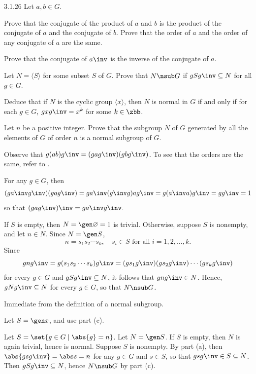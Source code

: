 \begin{exercise}{3.1.26} 
    Let $a,b \in G$.
    \begin{subexercises}
        \item Prove that the conjugate of the product of $a$ and $b$ is the product of the conjugate of $a$ and the conjugate of $b$.
	    Prove that the order of $a$ and the order of any conjugate of $a$ are the same.
        \item Prove that the conjugate of $a\inv $ is the inverse of the conjugate of $a$.
        \item Let $N = \langle S \rangle$ for some subset $S$ of $G$.
	    Prove that $N \nsub G$ if $gSg\inv  \subseteq N$ for all $g \in G$.
        \item Deduce that if $N$ is the cyclic group $\langle x \rangle$, then $N$ is normal in $G$ if and only if for each $g \in G$, $gxg\inv  = x^k$ for some $k \in \zbb$.
        \item Let $n$ be a positive integer.
	    Prove that the subgroup $N$ of $G$ generated by all the elements of $G$ of order $n$ is a normal subgroup of $G$.
    \end{subexercises}
\end{exercise}

\begin{solenum}
    \item Observe that $g(ab)g\inv = (gag\inv)(gbg\inv)$.
	To see that the orders are the same, refer to .
    \item For any $g \in G$, then
    \[
    	(ga\inv g\inv)(gag\inv) = ga\inv (g\inv g) ag\inv = g(a\inv a)g\inv = gg\inv = 1
    \]
    so that $(gag\inv)\inv = ga\inv g\inv$.
    \item If $S$ is empty, then $N = \gen\varnothing = 1$ is trivial.
	Otherwise, suppose $S$ is nonempty, and let $n \in N$.
	Since $N = \gen S$,
    \[
    	n = s_1s_2 \cdots s_k, \quad s_i \in S \text{ for all } i = 1, 2, \ldots, k.
    \]
    Since
    \[
        gng\inv = g(s_1s_2 \cdots s_k)g\inv = (gs_1g\inv)(gs_2g\inv) \cdots (gs_kg\inv)
    \]
    for every $g \in G$ and $gSg\inv \subseteq N$, it follows that $gng\inv \in N$.
    Hence, $gNg\inv \subseteq N$ for every $g \in G$, so that $N \nsub G$.
    \item \rightimp Immediate from the definition of a normal subgroup.

    \leftimp Let $S = \gen x$, and use part (c).
    \item Let $S = \set{g \in G \mid \abs{g} = n}$.
	Let $N = \gen S$.
	If $S$ is empty, then $N$ is again trivial, hence is normal.
	Suppose $S$ is nonempty.
	By part (a), then $\abs{gsg\inv} = \abs s = n$ for any $g \in G$ and $s \in S$, so that $gsg\inv \in S \subseteq N$.
	Then $gSg\inv \subseteq N$, hence $N \nsub G$ by part (c).
\end{solenum}

